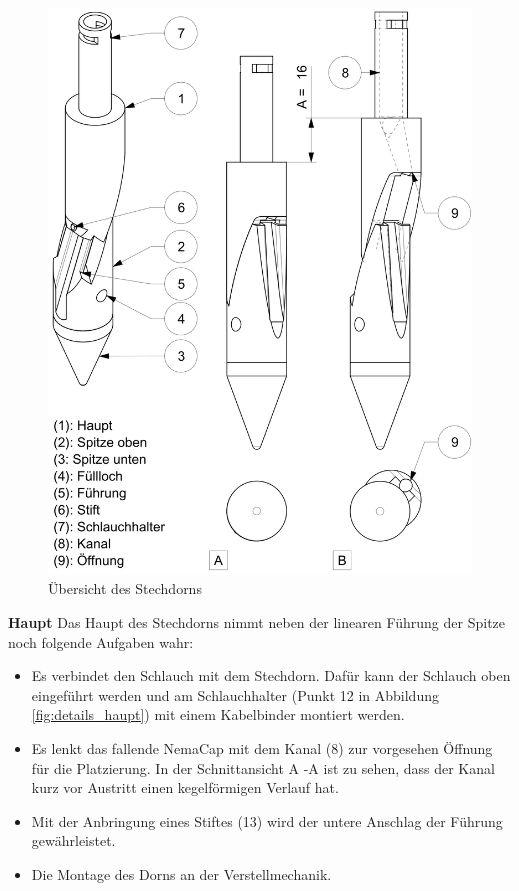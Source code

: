 	\begin{figure}[H]
	\includegraphics[scale=1.0]{Illustrationen/6-Umsetzung/details_stechdorn.jpg}
	\caption{Übersicht des Stechdorns}
	\label{fig:details_stechdorn}
	\end{figure}
\textbf{Haupt}
\newline
Das Haupt des Stechdorns nimmt neben der linearen Führung der Spitze noch folgende Aufgaben wahr:
\begin{itemize}
	\item Es verbindet den Schlauch mit dem Stechdorn. Dafür kann der Schlauch oben eingeführt werden und am Schlauchhalter (Punkt 12 in Abbildung \ref{fig:details_haupt}) mit einem Kabelbinder montiert werden.
	
	\item Es lenkt das fallende NemaCap mit dem Kanal (8) zur vorgesehen Öffnung für die Platzierung. In der Schnittansicht A -A ist zu sehen, dass der Kanal kurz vor Austritt einen kegelförmigen Verlauf hat. 
	
	\item Mit der Anbringung eines Stiftes (13) wird der untere Anschlag der Führung gewährleistet. 
		
	\item Die Montage des Dorns an der Verstellmechanik.
\end{itemize}

